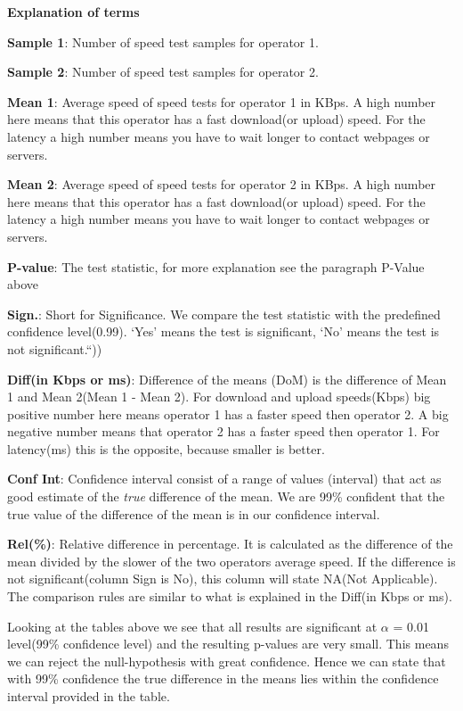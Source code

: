 \documentclass[]{article}
\begin{document}
\textbf{Explanation of terms}

\footnotesize

\textbf{Sample 1}: Number of speed test samples for operator 1.

\textbf{Sample 2}: Number of speed test samples for operator 2.

\textbf{Mean 1}: Average speed of speed tests for operator 1 in KBps. A
high number here means that this operator has a fast download(or upload)
speed. For the latency a high number means you have to wait longer to
contact webpages or servers.

\textbf{Mean 2}: Average speed of speed tests for operator 2 in KBps. A
high number here means that this operator has a fast download(or upload)
speed. For the latency a high number means you have to wait longer to
contact webpages or servers.

\textbf{P-value}: The test statistic, for more explanation see the
paragraph P-Value above

\textbf{Sign.}: Short for Significance. We compare the test statistic
with the predefined confidence level(0.99). `Yes' means the test is
significant, `No' means the test is not significant.``))

\textbf{Diff(in Kbps or ms)}: Difference of the means (DoM) is the
difference of Mean 1 and Mean 2(Mean 1 - Mean 2). For download and
upload speeds(Kbps) big positive number here means operator 1 has a
faster speed then operator 2. A big negative number means that operator
2 has a faster speed then operator 1. For latency(ms) this is the
opposite, because smaller is better.

\textbf{Conf Int}: Confidence interval consist of a range of values
(interval) that act as good estimate of the \emph{true} difference of
the mean. We are 99\% confident that the true value of the difference of
the mean is in our confidence interval.

\textbf{Rel(\%)}: Relative difference in percentage. It is calculated as
the difference of the mean divided by the slower of the two operators
average speed. If the difference is not significant(column Sign is No),
this column will state NA(Not Applicable). The comparison rules are
similar to what is explained in the Diff(in Kbps or ms).

\normalsize
Looking at the tables above we see that all results are significant at
\(\alpha\) = 0.01 level(99\% confidence level) and the resulting
p-values are very small. This means we can reject the null-hypothesis
with great confidence. Hence we can state that with 99\% confidence the
true difference in the means lies within the confidence interval
provided in the table.
\end{document}
